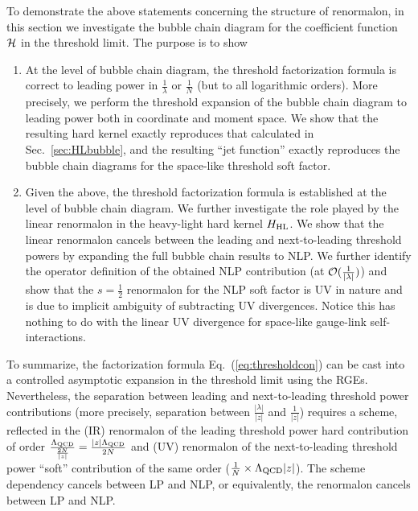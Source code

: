 \documentclass[a4paper,11pt]{article}
\begin{document}
To demonstrate the above statements concerning the structure of renormalon, in this section we investigate the bubble chain diagram for the coefficient function ${\cal H}$ in the threshold limit. The purpose is to show
\begin{enumerate}
    \item At the level of bubble chain diagram, the threshold factorization formula is correct to leading power in $\frac{1}{\lambda}$ or $\frac{1}{N}$ (but to all logarithmic orders). More precisely, we perform the threshold expansion of the bubble chain diagram to leading power both in coordinate and moment space. We show that the resulting hard kernel exactly reproduces that calculated in Sec.~\ref{sec:HLbubble}, and the resulting ``jet  function'' exactly reproduces the bubble chain diagrams for the space-like threshold soft factor. 
    \item Given the above, the threshold factorization formula is established at the level of bubble chain diagram. We further investigate the role played by the linear renormalon in the heavy-light hard kernel $H_{\rm HL}$. We show that the linear renormalon cancels between the leading and next-to-leading threshold powers by expanding the full bubble chain results to NLP.   We further identify the operator definition of the obtained NLP contribution (at ${\cal O}(\frac{1}{|\lambda|})$) and show that the $s=\frac{1}{2}$ renormalon for the NLP soft factor is UV in nature and is due to implicit ambiguity of subtracting UV divergences. Notice this has nothing to do with the linear UV divergence for space-like gauge-link self-interactions.
\end{enumerate}

To summarize, the factorization formula Eq.~(\ref{eq:thresholdcon}) can be cast into a controlled asymptotic expansion in the threshold limit using the RGEs.  Nevertheless, the separation between leading and next-to-leading threshold power contributions (more precisely, separation between $\frac{|\lambda|}{|z|}$ and $\frac{1}{|z|}$) requires a scheme, reflected in the (IR) renormalon of the leading threshold power hard contribution of order $\frac{\Lambda_{\rm QCD}}{\frac{2N}{|z|}}=\frac{|z|\Lambda_{\rm QCD}}{2N}$ and (UV) renormalon of the next-to-leading threshold power ``soft'' contribution of the same order ($\frac{1}{N} \times \Lambda_{\rm QCD}|z|$). The scheme dependency  cancels between LP and NLP, or equivalently, the renormalon cancels between LP and NLP.  
\end{document}
